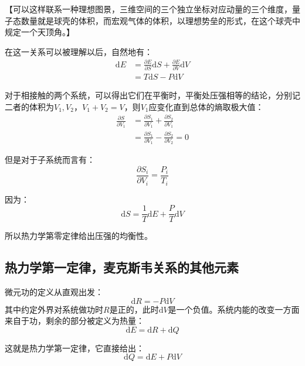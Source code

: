 \documentclass[UTF8]{ctexart}
\begin{document}
\begin{spacing}{2.0}
【可以这样联系一种理想图景，三维空间的三个独立坐标对应动量的三个维度，量子态数量就是球壳的体积，而宏观气体的体积，以理想势垒的形式，在这个球壳中规定一个天顶角。】

在这一关系可以被理解以后，自然地有：
\begin{equation}
\begin{aligned}
\text{d}E &= \frac{\partial E}{\partial S}\text{d}S+\frac{\partial E}{\partial V}\text{d}V \\
&= T\text{d}S - P\text{d}V
\end{aligned}
\end{equation}

对于相接触的两个系统，可以得出它们在平衡时，平衡处压强相等的结论，分别记二者的体积为$V_{1},V_{2}，V_{1}+V_{2}=V$，则$V_{1}$应变化直到总体的熵取极大值：
\begin{equation}
\begin{aligned}
\frac{\partial S}{\partial V_{1}}&= \frac{\partial S_{1}}{\partial V_{1}}+\frac{\partial S_{2}}{\partial V_{1}}\\
&=\frac{\partial S_{1}}{\partial V_{1}}-\frac{\partial S_{2}}{\partial V_{{2}}} = 0
\end{aligned}
\end{equation}

但是对于子系统而言有：
\begin{equation}
\frac{\partial S_{i}}{\partial V_{i}}=\frac{P_{i}}{T_{i}}
\end{equation}

因为：
\begin{equation}
\text{d}S = \frac{1}{T}\text{d}E+\frac{P}{T}\text{d}V
\end{equation}

所以热力学第零定律给出压强的均衡性。

\subsection{热力学第一定律，麦克斯韦关系的其他元素}
微元功的定义从直观出发：
\begin{equation}
\text{d}R=-P\text{d}V
\end{equation}
其中约定外界对系统做功时$R$是正的，此时$\text{d}V$是一个负值。系统内能的改变一方面来自于功，剩余的部分被定义为热量：
\begin{equation}
\text{d}E=\text{d}R+\text{d}Q
\end{equation}

这就是热力学第一定律，它直接给出：
\begin{equation}
\text{d}Q=\text{d}E+P\text{d}V
\end{equation}


\end{spacing}
\end{document}
